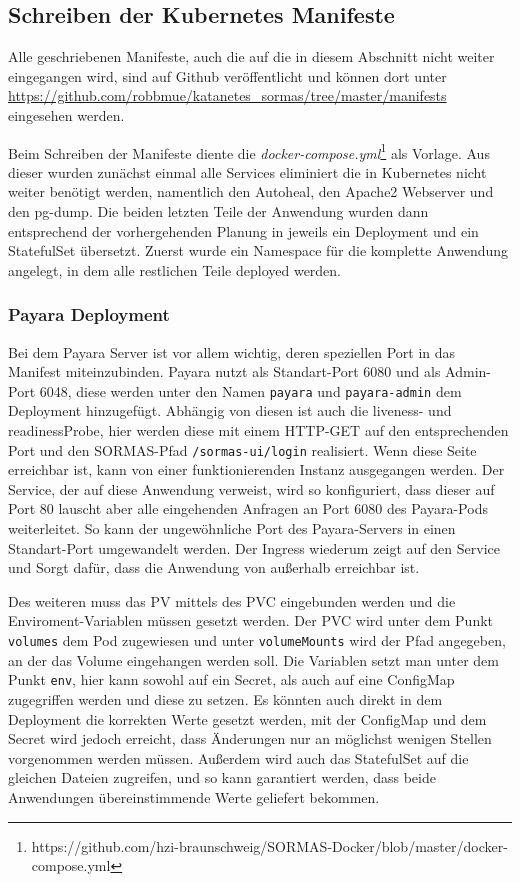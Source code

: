 \subsection{Schreiben der Kubernetes Manifeste}

Alle geschriebenen Manifeste, auch die auf die in diesem Abschnitt nicht weiter eingegangen wird, sind auf Github veröffentlicht und können dort unter \url{https://github.com/robbmue/katanetes_sormas/tree/master/manifests} eingesehen werden. 

Beim Schreiben der Manifeste diente die \textit{docker-compose.yml}\footnote{https://github.com/hzi-braunschweig/SORMAS-Docker/blob/master/docker-compose.yml} als Vorlage.
Aus dieser wurden zunächst einmal alle Services eliminiert die in Kubernetes nicht weiter benötigt werden, namentlich den Autoheal, den Apache2 Webserver und den pg-dump.
Die beiden letzten Teile der Anwendung wurden dann entsprechend der vorhergehenden Planung in jeweils ein Deployment und ein StatefulSet übersetzt.
Zuerst wurde ein Namespace für die komplette Anwendung angelegt, in dem alle restlichen Teile deployed werden.

\hfill \newline
\subsubsection{Payara Deployment}
Bei dem Payara Server ist vor allem wichtig, deren speziellen Port in das Manifest miteinzubinden.
Payara nutzt als Standart-Port 6080 und als Admin-Port 6048, diese werden unter den Namen \texttt{payara} und \texttt{payara-admin} dem Deployment hinzugefügt.
Abhängig von diesen ist auch die liveness- und readinessProbe, hier werden diese mit einem \ac{HTTP}-GET auf den entsprechenden Port und den \ac{SORMAS}-Pfad \texttt{/sormas-ui/login} realisiert.
Wenn diese Seite erreichbar ist, kann von einer funktionierenden Instanz ausgegangen werden.
Der Service, der auf diese Anwendung verweist, wird so konfiguriert, dass dieser auf Port 80 lauscht aber alle eingehenden Anfragen an Port 6080 des Payara-Pods weiterleitet.
So kann der ungewöhnliche Port des Payara-Servers in einen Standart-Port umgewandelt werden. 
Der Ingress wiederum zeigt auf den Service und Sorgt dafür, dass die Anwendung von außerhalb erreichbar ist.

Des weiteren muss das \ac{PV} mittels des \ac{PVC} eingebunden werden und die Enviroment-Variablen müssen gesetzt werden. 
Der \ac{PVC} wird unter dem Punkt \texttt{volumes} dem Pod zugewiesen und unter \texttt{volumeMounts} wird der Pfad angegeben, an der das Volume eingehangen werden soll. 
Die Variablen setzt man unter dem Punkt \texttt{env}, hier kann sowohl auf ein Secret, als auch auf eine ConfigMap zugegriffen werden und diese zu setzen.
Es könnten auch direkt in dem Deployment die korrekten Werte gesetzt werden, mit der ConfigMap und dem Secret wird jedoch erreicht, dass Änderungen nur an möglichst wenigen Stellen vorgenommen werden müssen.
Außerdem wird auch das StatefulSet auf die gleichen Dateien zugreifen, und so kann garantiert werden, dass beide Anwendungen übereinstimmende Werte geliefert bekommen.

